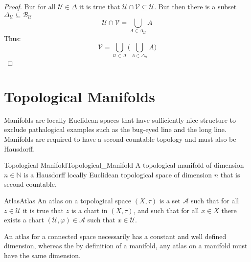 \documentclass[oneside]{book}                                                  %
\begin{document}
\begin{proof}
                But for all $\mathcal{U}\in\Delta$ it is true that
                $\mathcal{U}\cap\mathcal{V}\subseteq\mathcal{U}$. But then there
                is a subset
                $\Delta_{\mathcal{U}}\subseteq\mathscr{B}_{\mathcal{U}}$
                \begin{equation}
                    \mathcal{U}\cap\mathcal{V}=
                    \bigcup_{A\in\Delta_{\mathcal{U}}}A
                \end{equation}
                Thus:
                \begin{equation}
                    \mathcal{V}=\bigcup_{\mathcal{U}\in\Delta}\Big(
                        \bigcup_{A\in\Delta_{\mathcal{U}}}A\Big)
                \end{equation}
            \end{proof}
        \section{Topological Manifolds}
            Manifolds are locally Euclidean spaces that have sufficiently nice
            structure to exclude pathalogical examples such as the bug-eyed line
            and the long line. Manifolds are required to have a second-countable
            topology and must also be Hausdorff.
            \begin{fdefinition}{Topological Manifold}{Topological_Manifold}
                A topological manifold of dimension $n\in\mathbb{N}$ is a
                Hausdorff locally Euclidean topological space of dimension $n$
                that is second countable.
            \end{fdefinition}
            \begin{fdefinition}{Atlas}{Atlas}
                An atlas on a topological space $(X,\tau)$ is a set
                $\mathcal{A}$ such that for all $z\in\mathcal{U}$ it is true
                that $z$ is a chart in $(X,\tau)$, and such that for all
                $x\in{X}$ there exists a chart
                $(\mathcal{U},\varphi)\in\mathcal{A}$ such that
                $x\in\mathcal{U}$.
            \end{fdefinition}
            An atlas for a connected space necessarily has a constant and well
            defined dimension, whereas the by definition of a manifold, any
            atlas on a manifold must have the same dimension.
\end{document}
